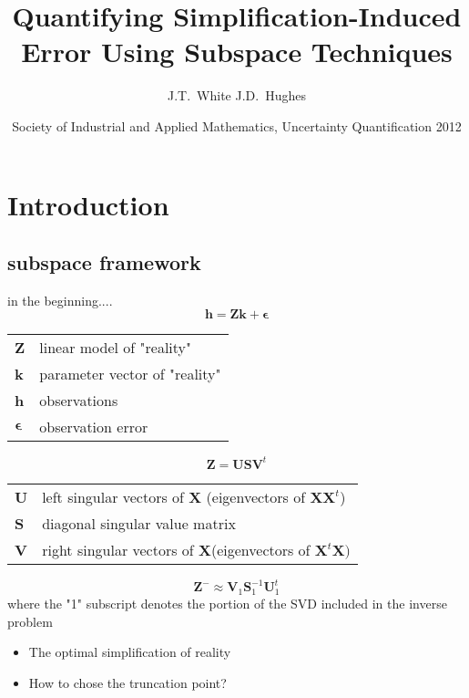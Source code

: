 \documentclass{beamer}
\title[]{Quantifying Simplification-Induced Error Using Subspace Techniques}
\author[White, Hughes] %
{J.T.~White J.D.~Hughes }
\institute[USGS and Watermark Numerical Computing] %
{
  U.S. Geological Survey\\
  Tampa, Florida, USA
  }
\date[UQ12] %
{Society of Industrial and Applied Mathematics, Uncertainty Quantification 2012}
\begin{document}
\begin{frame}
  \titlepage
\end{frame}

\begin{frame}
\tableofcontents
\end{frame}


\section{Introduction}


\subsection{subspace framework}


\begin{frame}{in the beginning....}
\begin{equation*}
\textbf{h} = \textbf{Zk} + {\boldsymbol \epsilon}
\end{equation*}
\begin{tabular}{ll}
\textbf{Z}&linear model of "reality"\\ 
\textbf{k}&parameter vector of "reality"\\
\textbf{h}&observations\\
$\boldsymbol{ \epsilon}$&observation error\\
\end{tabular}
\end{frame}

\begin{frame}
\begin{equation*}
\textbf{Z} = \textbf{USV}^t
\end{equation*}
\begin{tabular}{ll}
\textbf{U}&left singular vectors of \textbf{X} (eigenvectors of $\textbf{XX}^t$)\\
\textbf{S}&diagonal singular value matrix\\
\textbf{V}&right singular vectors of \textbf{X}(eigenvectors of $\textbf{X}^t\textbf{X})$
\end{tabular}
\end{frame}

\begin{frame}
\begin{equation*}
\textbf{Z}^{-} \approx \textbf{V}_1\textbf{S}^{-1}_1\textbf{U}^t_1
\end{equation*}
where the "1" subscript denotes the portion of the SVD included in the inverse problem
\begin{itemize}
\item{The optimal simplification of reality}
\item{How to chose the truncation point?}
\end{itemize}
\end{frame}
\end{document}
